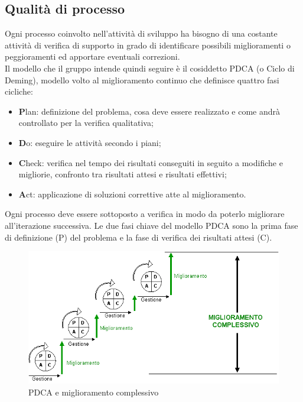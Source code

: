 \documentclass[a4paper,11pt]{article}
\begin{document}
\subsection{Qualità di processo}

Ogni processo coinvolto nell'attività di sviluppo ha bisogno di una costante attività di verifica di supporto in grado di identificare possibili miglioramenti o peggioramenti ed apportare eventuali correzioni. \\
Il modello che il gruppo intende quindi seguire è il cosiddetto PDCA (o Ciclo di Deming), modello volto al miglioramento continuo che definisce quattro fasi cicliche:
\begin{itemize}
\item \textbf{P}lan: definizione del problema, cosa deve essere realizzato e come andrà controllato per la verifica qualitativa;
\item \textbf{D}o: eseguire le attività secondo i piani;
\item \textbf{C}heck: verifica nel tempo dei risultati conseguiti in seguito a modifiche e migliorie, confronto tra risultati attesi e risultati effettivi; %
\item \textbf{A}ct: applicazione di soluzioni correttive atte al miglioramento.
\end{itemize}
Ogni processo deve essere sottoposto a verifica in modo da poterlo migliorare all'iterazione successiva. 
Le due fasi chiave del modello PDCA sono la prima fase di definizione (P) del problema e la fase di verifica dei risultati attesi (C). 
\begin{figure}[h!]
\centering
\includegraphics[scale=0.6]{../../images/PDCA}
\caption{PDCA e miglioramento complessivo}
\end{figure}
\end{document}
